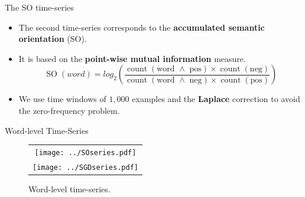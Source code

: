 \documentclass[handout]{beamer}
\begin{document}
\begin{frame}{The SO time-series }
\begin{scriptsize}
\begin{itemize}
\item  The second time-series corresponds to the \textbf{accumulated semantic orientation} (SO).
\item It is based on the \textbf{point-wise mutual information} measure.
\begin{equation}\label{eq:so}
 \operatorname{SO}(word) = log_2 \left( \frac{\operatorname{count}(\text{word $\wedge$ pos}) \times \operatorname{count}(\text{neg})}{\operatorname{count}(\text{word $\wedge$ neg}) \times \operatorname{count}(\text{pos})}\right)
\end{equation}
\item We use time windows of $1,000$ examples and the \textbf{Laplace} correction to avoid the zero-frequency problem. 


\end{itemize}
\end{scriptsize}

\end{frame}


\begin{frame}{Word-level Time-Series}
\begin{scriptsize}
\begin{figure}[htb]
\begin{center}
\begin{tabular}{c}
\texttt{[image: ../SOseries.pdf]} \\
\texttt{[image: ../SGDseries.pdf]}\\
\end{tabular}
\caption{Word-level time-series.}
\label{fig:timeseries}
\end{center}
\end{figure}
\end{scriptsize}

\end{frame}
\end{document}
